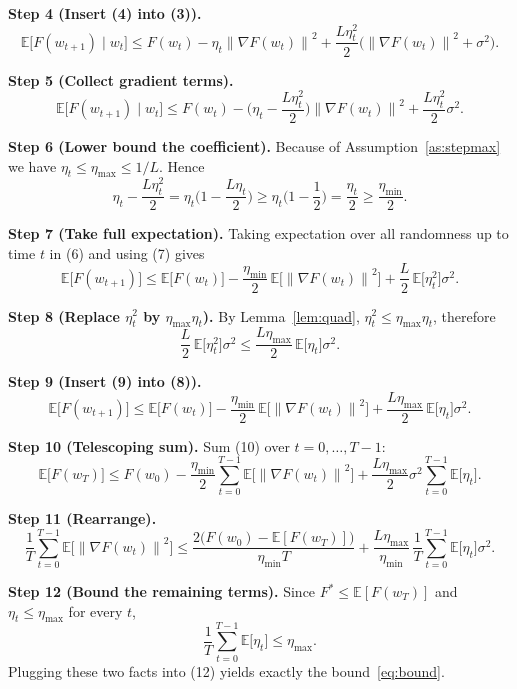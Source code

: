 \documentclass{article}
\newcommand{\E}{\mathbb{E}}
\newcommand{\norm}[1]{\left\|#1\right\|}
\begin{document}
\noindent\textbf{Step 4 (Insert (4) into (3)).}
\[
\E\!\big[F(w_{t+1})\mid w_{t}\big]
\le F(w_{t})-\eta_{t}\norm{\nabla F(w_{t})}^{2}
+\frac{L\eta_{t}^{2}}{2}\big(\norm{\nabla F(w_{t})}^{2}+\sigma^{2}\big).
\tag{5}
\]

\noindent\textbf{Step 5 (Collect gradient terms).}
\[
\E\!\big[F(w_{t+1})\mid w_{t}\big]
\le F(w_{t})-\Big(\eta_{t}-\frac{L\eta_{t}^{2}}{2}\Big)\norm{\nabla F(w_{t})}^{2}
+\frac{L\eta_{t}^{2}}{2}\sigma^{2}.
\tag{6}
\]

\noindent\textbf{Step 6 (Lower bound the coefficient).}  
Because of Assumption~\ref{as:stepmax} we have $\eta_{t}\le\eta_{\max}\le 1/L$. Hence
\[
\eta_{t}-\frac{L\eta_{t}^{2}}{2}
= \eta_{t}\Big(1-\frac{L\eta_{t}}{2}\Big)
\ge \eta_{t}\Big(1-\frac{1}{2}\Big)
= \frac{\eta_{t}}{2}
\ge \frac{\eta_{\min}}{2}.
\tag{7}
\]

\noindent\textbf{Step 7 (Take full expectation).}  
Taking expectation over all randomness up to time $t$ in (6) and using (7) gives
\[
\E\!\big[F(w_{t+1})\big]
\le \E\!\big[F(w_{t})\big]
-\frac{\eta_{\min}}{2}\,\E\!\big[\norm{\nabla F(w_{t})}^{2}\big]
+\frac{L}{2}\,\E\!\big[\eta_{t}^{2}\big]\sigma^{2}.
\tag{8}
\]

\noindent\textbf{Step 8 (Replace $\eta_{t}^{2}$ by $\eta_{\max}\eta_{t}$).}  
By Lemma~\ref{lem:quad}, $\eta_{t}^{2}\le\eta_{\max}\eta_{t}$, therefore
\[
\frac{L}{2}\,\E\!\big[\eta_{t}^{2}\big]\sigma^{2}
\le
\frac{L\eta_{\max}}{2}\,\E\!\big[\eta_{t}\big]\sigma^{2}.
\tag{9}
\]

\noindent\textbf{Step 9 (Insert (9) into (8)).}
\[
\E\!\big[F(w_{t+1})\big]
\le \E\!\big[F(w_{t})\big]
-\frac{\eta_{\min}}{2}\,\E\!\big[\norm{\nabla F(w_{t})}^{2}\big]
+\frac{L\eta_{\max}}{2}\,\E\!\big[\eta_{t}\big]\sigma^{2}.
\tag{10}
\]

\noindent\textbf{Step 10 (Telescoping sum).}  
Sum (10) over $t=0,\dots,T-1$:
\[
\E\!\big[F(w_{T})\big]
\le F(w_{0})
-\frac{\eta_{\min}}{2}\sum_{t=0}^{T-1}\E\!\big[\norm{\nabla F(w_{t})}^{2}\big]
+\frac{L\eta_{\max}}{2}\sigma^{2}\sum_{t=0}^{T-1}\E\!\big[\eta_{t}\big].
\tag{11}
\]

\noindent\textbf{Step 11 (Rearrange).}
\[
\frac{1}{T}\sum_{t=0}^{T-1}\E\!\big[\norm{\nabla F(w_{t})}^{2}\big]
\le
\frac{2\big(F(w_{0})-\E[F(w_{T})]\big)}{\eta_{\min}T}
+ \frac{L\eta_{\max}}{\eta_{\min}}\,
\frac{1}{T}\sum_{t=0}^{T-1}\E\!\big[\eta_{t}\big]\sigma^{2}.
\tag{12}
\]

\noindent\textbf{Step 12 (Bound the remaining terms).}  
Since $F^{*}\le \E[F(w_{T})]$ and $\eta_{t}\le\eta_{\max}$ for every $t$,
\[
\frac{1}{T}\sum_{t=0}^{T-1}\E\!\big[\eta_{t}\big]\le\eta_{\max}.
\]
Plugging these two facts into (12) yields exactly the bound~\eqref{eq:bound}.
\end{document}

